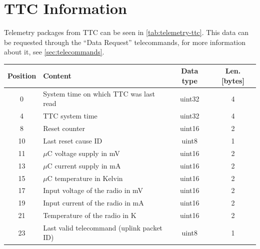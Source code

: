 \section{TTC Information}

Telemetry packages from TTC can be seen in \autoref{tab:telemetry-ttc}. This data can be requested through the ``Data Request'' telecommands, for more information about it, see \autoref{sec:telecommands}.

\begin{table}[!ht]
	\centering
    \small
	\begin{tabular}{clcc}
		\toprule[1.5pt]
		\textbf{Position}   & \textbf{Content}                          & \textbf{Data type} & \textbf{Len. [bytes]} \\
		\midrule                                                                                                          
		0                   & System time on which TTC was last read    & uint32             & 4                     \\
		4                   & TTC system time                           & uint32             & 4                     \\
		8                   & Reset counter                             & uint16             & 2                     \\
		10                  & Last reset cause ID                       & uint8              & 1                     \\
		11                  & $\mu$C voltage supply in mV               & uint16             & 2                     \\
		13                  & $\mu$C current supply in mA               & uint16             & 2                     \\
		15                  & $\mu$C temperature in Kelvin              & uint16             & 2                     \\
		17                  & Input voltage of the radio in mV          & uint16             & 2                     \\
		19                  & Input current of the radio in mA          & uint16             & 2                     \\
		21                  & Temperature of the radio in K             & uint16             & 2                     \\
		23                  & Last valid telecommand (uplink packet ID) & uint8              & 1                     \\

\end{tabular}
\end{table}
